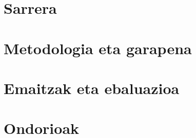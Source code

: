 \documentclass[a4paper, 11pt, oneside]{memoir}
\title{\izenburua}
\author{\egileak}
\date{\data}
\begin{document}

\clearpage

\frontmatter
{}
\pagestyle{plain}

\begin{KeepFromToc}
  \tableofcontents
\end{KeepFromToc}
\clearpage

\mainmatter
\pagestyle{ruled}

\chapter{Sarrera}\label{ch:sarrera}


\chapter{Metodologia eta garapena}\label{ch:garapena}


\chapter{Emaitzak eta ebaluazioa}\label{ch:emaitzak}


\chapter{Ondorioak}\label{ch:ondorioak}

\end{document}
